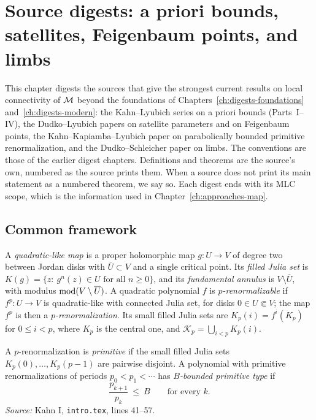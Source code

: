 \chapter[A priori bounds and limbs]{Source digests: a priori bounds, satellites, Feigenbaum points, and limbs}
\label{ch:digests-apriori-limbs}

This chapter digests the sources that give the strongest current results on local
connectivity of $\mathcal M$ beyond the foundations of Chapters~\ref{ch:digests-foundations}
and~\ref{ch:digests-modern}: the Kahn--Lyubich series on a priori bounds (Parts~I--IV),
the Dudko--Lyubich papers on satellite parameters and on Feigenbaum points, the
Kahn--Kapiamba--Lyubich paper on parabolically bounded primitive renormalization, and
the Dudko--Schleicher paper on limbs.  The conventions are those of the earlier digest
chapters.  Definitions and theorems are the source's own, numbered as the source prints
them.  When a source does not print its main statement as a numbered theorem, we say so.
Each digest ends with its MLC scope, which is the information used in
Chapter~\ref{ch:approaches-map}.

\section{Common framework}
\label{sec:apriori-framework}

A \emph{quadratic-like map} is a proper holomorphic map $g\colon U\to V$ of degree two
between Jordan disks with $\overline U\subset V$ and a single critical point.  Its
\emph{filled Julia set} is $K(g)=\{z:\ g^n(z)\in U\text{ for all }n\ge0\}$, and its
\emph{fundamental annulus} is $V\setminus\overline U$, with modulus
$\operatorname{mod}(V\setminus\overline U)$.  A quadratic polynomial $f$ is
\emph{$p$-renormalizable} if $f^p\colon U\to V$ is quadratic-like with connected Julia
set, for disks $0\in U\Subset V$; the map $f^p$ is then a \emph{$p$-renormalization}.
Its small filled Julia sets are $K_p(i)=f^i(K_p)$ for $0\le i<p$, where $K_p$ is the
central one, and $\mathcal K_p=\bigcup_{i<p}K_p(i)$.

\begin{definition}
\label{def:apriori-primitive}
A $p$-renormalization is \emph{primitive} if the small filled Julia sets
$K_p(0),\dots,K_p(p-1)$ are pairwise disjoint.  A polynomial with primitive
renormalizations of periods $p_0<p_1<\cdots$ has \emph{$B$-bounded primitive type} if
\[
\frac{p_{k+1}}{p_k}\ \le\ B\qquad\text{for every }k.
\]
\emph{Source:} Kahn I, \texttt{intro.tex}, lines 41--57.
\end{definition}

